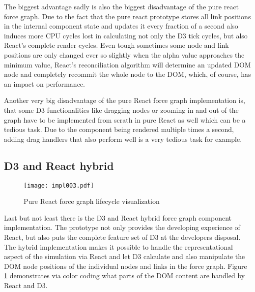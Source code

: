 The biggest advantage sadly is also the biggest disadvantage of the pure react force graph. Due to the fact that the pure react prototype stores all link positions in the internal component state and updates it every fraction of a second also induces more CPU cycles lost in calculating not only the D3 tick cycles, but also React's complete render cycles. Even tough sometimes some node and link positions are only changed ever so slightly when the alpha value approaches the minimum value, React's reconciliation algorithm will determine an updated DOM node and completely recommit the whole node to the DOM, which, of course, has an impact on performance. 

Another very big disadvantage of the pure React force graph implementation is, that some D3 functionalities like dragging nodes or zooming in and out of the graph have to be implemented from scrath in pure React as well which can be a tedious task. Due to the component being rendered multiple times a second, adding drag handlers that also perform well is a very tedious task for example. 


\subsection{D3 and React hybrid}

\begin{figure}
\centering
\texttt{[image: impl003.pdf]}
\caption{Pure React force graph lifecycle visualization}
\label{fig:reactD3HybridLifeCycle}
\end{figure}

Last but not least there is the D3 and React hybrid force graph component implementation. The prototype not only provides the developing experience of React, but also puts the complete feature set of D3 at the developers disposal. The hybrid implementation makes it possible to handle the representational aspect of the simulation via React and let D3 calculate and also manipulate the DOM node positions of the individual nodes and links in the force graph. Figure \ref{fig:reactD3HybridLifeCycle} demonstrates via color coding what parts of the DOM content are handled by React and D3. 

